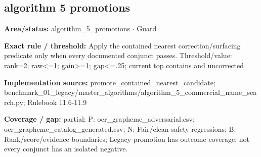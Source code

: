\subsection*{algorithm 5 promotions}
\begin{tcolorbox}[enhanced,breakable,colback=white,colframe=Muted!45,boxrule=0.45pt,arc=1.5pt,left=6pt,right=6pt,top=5pt,bottom=5pt,title={\texttt{A5-PROMOTE-CONTAINED-NEAREST}},title after break={\texttt{A5-PROMOTE-CONTAINED-NEAREST}\ (continued)},fonttitle=\headingfont\bfseries\color{Navy},coltitle=Navy]
\textbf{Area/status:} algorithm\_\allowbreak{}5\_\allowbreak{}promotions $\boldsymbol{\cdot}$ Guard\par
\smallskip
\textbf{Exact rule / threshold:} Apply the contained nearest correction/\allowbreak{}surfacing predicate only when every documented conjunct passes. Threshold/\allowbreak{}value: rank=2; raw<=1; gain>=1; gap<=.25; current top contains and uncorrected\par
\smallskip
\textbf{Implementation source:} promote\_\allowbreak{}contained\_\allowbreak{}nearest\_\allowbreak{}candidate; benchmark\_\allowbreak{}01\_\allowbreak{}legacy/\allowbreak{}master\_\allowbreak{}algorithms/\allowbreak{}algorithm\_\allowbreak{}5\_\allowbreak{}commercial\_\allowbreak{}name\_\allowbreak{}search.py; Rulebook 11.6-11.9\par
\smallskip
\textbf{Coverage / gap:} partial; P: ocr\_\allowbreak{}grapheme\_\allowbreak{}adversarial.csv; ocr\_\allowbreak{}grapheme\_\allowbreak{}catalog\_\allowbreak{}generated.csv; N: Fair/\allowbreak{}clean safety regressions; B: Rank/\allowbreak{}score/\allowbreak{}evidence boundaries; Legacy promotion has outcome coverage; not every conjunct has an isolated negative.
\end{tcolorbox}

